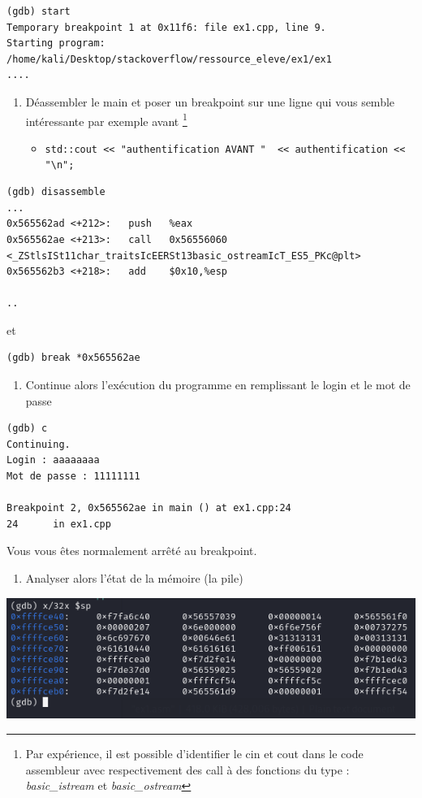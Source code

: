 \documentclass[french, 12pt]{article}%
\newcommand{\itemE}{\item[$\bullet$]}
\begin{document}
\begin{lstlisting}[style=commande]
(gdb) start
Temporary breakpoint 1 at 0x11f6: file ex1.cpp, line 9.
Starting program: /home/kali/Desktop/stackoverflow/ressource_eleve/ex1/ex1 
....
\end{lstlisting}

\begin{enumerate}[resume]
\item Déassembler le main et poser un breakpoint sur une ligne qui vous semble intéressante par exemple avant \footnote{Par expérience, il est possible d'identifier le cin et cout dans le code assembleur avec respectivement des call à des fonctions du type : \textit{basic\_istream} et \textit{basic\_ostream}} 
\begin{itemize}
\itemE \verb?std::cout << "authentification AVANT "  << authentification << "\n"; ?
\end{itemize}

\end{enumerate}

\begin{lstlisting}[style=commande]
(gdb) disassemble 
...
0x565562ad <+212>:   push   %eax
0x565562ae <+213>:   call   0x56556060 <_ZStlsISt11char_traitsIcEERSt13basic_ostreamIcT_ES5_PKc@plt>
0x565562b3 <+218>:   add    $0x10,%esp

..
\end{lstlisting}
et
\begin{lstlisting}[style=commande]
(gdb) break *0x565562ae
\end{lstlisting}

\begin{enumerate}[resume]
\item Continue alors l'exécution du programme en remplissant le login et le mot de passe

\end{enumerate}
\begin{lstlisting}[style=commande]
(gdb) c
Continuing.
Login : aaaaaaaa
Mot de passe : 11111111

Breakpoint 2, 0x565562ae in main () at ex1.cpp:24
24      in ex1.cpp
\end{lstlisting}
Vous vous êtes normalement arrêté au breakpoint. 

\begin{enumerate}[resume]
\item Analyser alors l'état de la mémoire (la pile)
\end{enumerate}

\begin{center}
\includegraphics[scale=1.0]{./ressource/dump_stack}
\end{center}
\end{document}
